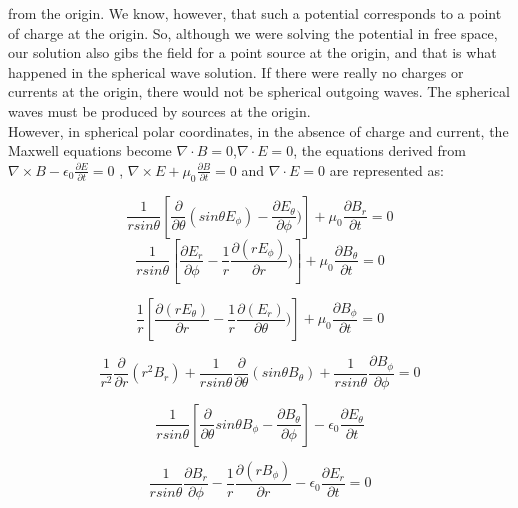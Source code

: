 \documentclass[paper=a4, fontsize=11pt]{scrartcl} %
\numberwithin{equation}{section} %
\numberwithin{figure}{section} %
\numberwithin{table}{section} %
\begin{document}
from the origin. We know, however, that such a potential corresponds to a point of charge at the origin. So, although we were solving
the potential in free space, our solution also gibs the field for a point source at the origin, and that is what happened in the spherical wave 
solution. If there were really no charges or currents at the origin, there would not be spherical outgoing waves. The spherical waves must be 
produced by sources at the origin.
\\However, in spherical polar coordinates, in the absence of charge and current, the Maxwell equations become $\nabla\cdot B = 0 $,$\nabla\cdot E = 0 $, the equations derived from $\nabla\times B - \epsilon_0 \frac{\partial E}{\partial t} =0$ , $\nabla\times E + \mu_0 \frac{\partial B}{\partial t} =0$  and $\nabla\cdot E =0$ are represented as:

\begin{equation}
\frac{1}{r sin \theta}[\frac{\partial}{\partial \theta} (sin \theta E_\phi) - \frac{\partial E_\theta}{\partial \phi})] + \mu_0 \frac{\partial B_r}{\partial t}=0
\end{equation}
\begin{equation}
\frac{1}{r sin \theta}[\frac{\partial E_r}{\partial \phi} - \frac{1}{r}\frac{\partial (r E_\phi)}{\partial r})] + \mu_0 \frac{\partial B_\theta}{\partial t}=0
\end{equation}

\begin{equation}
\frac{1}{r }[\frac{\partial (r E_\theta)}{\partial r} - \frac{1}{r}\frac{\partial (E_r)}{\partial \theta})] + \mu_0 \frac{\partial B_\phi}{\partial t}=0
\end{equation}

\begin{equation}
\frac{1}{r^{2}} \frac{\partial}{\partial r} (r^{2}B_{r})+ \frac{1}{r sin \theta} \frac{\partial}{\partial \theta} (sin \theta B_{\theta})+ \frac{1}{r sin \theta} \frac{\partial B_{\phi}}{\partial \phi} =0
\end{equation}

\begin{equation}
\frac{1}{r sin \theta}[\frac{\partial}{\partial \theta} sin \theta B_\phi - \frac{\partial B_{\theta}}{\partial \phi}]-\epsilon_{0} \frac{\partial E_{\theta}} {\partial t}
\end{equation}

\begin{equation}
\frac{1}{r sin \theta} \frac{\partial B_r}{\partial \phi} - \frac{1}{r}\frac{\partial (r B_\phi)}{\partial r}-\epsilon_{0} \frac{\partial E_{r}} {\partial t} =0
\end{equation}
\end{document}
